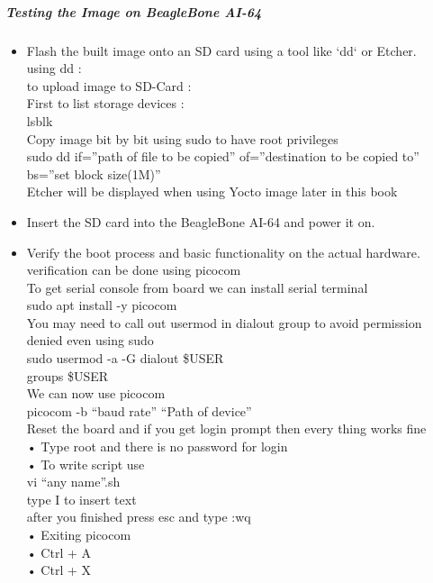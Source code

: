 \subparagraph{Testing the Image on BeagleBone AI-64}
\begin{itemize}
    \item Flash the built image onto an SD card using a tool like `dd` or Etcher. \\
    using dd :\\
    to upload image to SD-Card :\\
    First to list storage devices :\\
    lsblk\\
    Copy image bit by bit using sudo to have root privileges\\
    sudo dd if=”path of file to be copied” of=”destination to be copied to” bs=”set block size(1M)”\\
    Etcher will be displayed when using Yocto image later in this book

    \item Insert the SD card into the BeagleBone AI-64 and power it on.
    \item Verify the boot process and basic functionality on the actual hardware.\\
    verification can be done using picocom \\
    To get serial console from board we can install serial terminal \\
    sudo apt install -y picocom \\
    You may need to call out usermod in dialout group to avoid permission denied even using sudo \\
    sudo usermod -a -G dialout \$USER \\
    groups \$USER \\
    We can now use picocom  \\
    picocom -b “baud rate” “Path of device”  \\
    Reset the board and if you get login prompt then every thing works fine \\
    •	Type root and there is no password for login \\
    •	To write script use  \\
    vi “any name”.sh  \\
    type I to insert text \\
    after you finished press esc and type :wq \\
    •	Exiting picocom  \\
        \indent •	 Ctrl + A \\
        \indent •	 Ctrl + X \\

    
    
\end{itemize}

